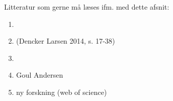 Litteratur som gerne må læses ifm. med dette afsnit: 
%
 \begin{enumerate} [topsep=6pt,itemsep=-1ex]
   \item \sout{\parencite{Halvorsen1999}}
   \item (Dencker Larsen 2014, s. 17-38)
   \item \parencite{Baum2001, Baum2006}
   \item Goul Andersen
   \item ny forskning (web of science)
 \end{enumerate}





